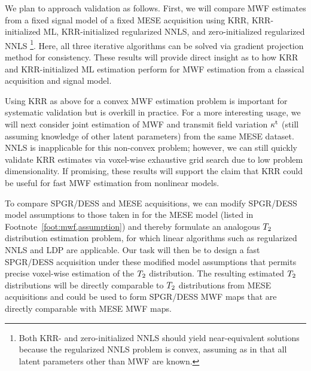 We plan to approach validation as follows.
First,
we will compare \invivo MWF estimates
from a fixed signal model
of a fixed MESE acquisition
using KRR, KRR-initialized ML,
KRR-initialized regularized NNLS,
and zero-initialized regularized NNLS
\footnote{Both KRR- and zero-initialized NNLS 
	should yield near-equivalent solutions
	because the regularized NNLS problem is convex,
	assuming as in \cite{whittall:89:qio, mackay:94:ivv}
	that all latent parameters other than MWF are known.
}.
Here, 
all three iterative algorithms can be solved
via gradient projection method
for consistency.
These results will provide direct insight
as to how KRR and KRR-initialized ML estimation perform
for \invivo MWF estimation
from a classical acquisition and signal model.

Using KRR as above
for a convex MWF estimation problem 
is important for systematic validation
but is overkill in practice.
For a more interesting usage,
we will next consider joint estimation
of MWF and transmit field variation $\kappa^{\mathrm{t}}$
(still assuming knowledge of other latent parameters)
from the same MESE dataset.
NNLS is inapplicable 
for this non-convex problem;
however, 
we can still quickly validate KRR estimates 
via voxel-wise exhaustive grid search
due to low problem dimensionality.
If promising,
these results will support the claim
that KRR could be useful 
for fast \invivo MWF estimation 
from nonlinear models.

To compare SPGR/DESS and MESE acquisitions,
we can modify SPGR/DESS model assumptions
to those taken in \cite{prasloski:12:rwc}
for the MESE model
(listed in Footnote~\ref{foot:mwf,assumption})
and thereby formulate an analogous
$T_2$ distribution estimation problem,
for which linear algorithms 
such as regularized NNLS and LDP are applicable.
Our task will then be 
to design a fast SPGR/DESS acquisition
under these modified model assumptions
that permits precise voxel-wise estimation 
of the $T_2$ distribution.
The resulting estimated $T_2$ distributions
will be directly comparable 
to $T_2$ distributions 
from MESE acquisitions
and could be used
to form SPGR/DESS MWF maps
that are directly comparable 
with MESE MWF maps.

